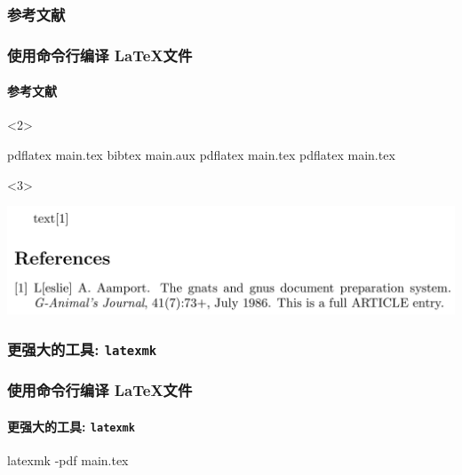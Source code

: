\subsubsection{参考文献}

\begin{frame}[fragile, t]
  \frametitle{使用命令行编译 \LaTeX 文件}
  \framesubtitle{参考文献}


\begin{onlyenv}<2>
\begin{cmdcode}
pdflatex main.tex
bibtex main.aux
pdflatex main.tex
pdflatex main.tex
\end{cmdcode}  
\end{onlyenv}

\begin{onlyenv}<3>
  \begin{center}
    \includegraphics[width=\textwidth]{bib-ref.png}
  \end{center}
\end{onlyenv}
\end{frame}

\subsubsection{更强大的工具: \texttt{latexmk}}

\begin{frame}[fragile, t]
  \frametitle{使用命令行编译 \LaTeX 文件}
  \framesubtitle{更强大的工具: \texttt{latexmk}}


\begin{cmdcode}
latexmk -pdf main.tex
\end{cmdcode}
\end{frame}

